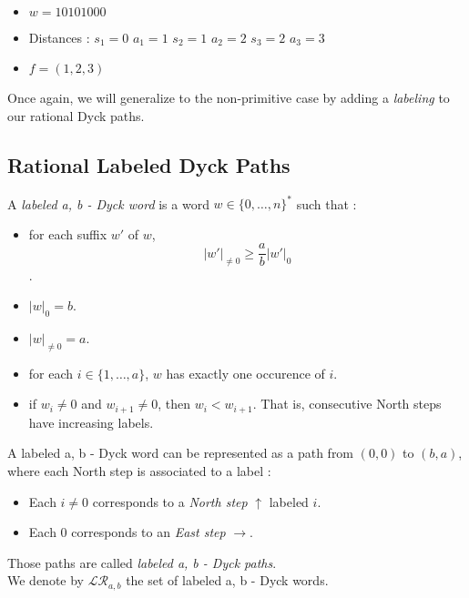 \begin{example}[$a < b : a = 3, b = 5,
    \mathcal{R}_{a,b} \to \mathcal{PF'}_{a,b}$]
    ~\
    \begin{itemize}
        \item $w = 10101000$
    \end{itemize}
    
    \begin{itemize}
        \item Distances : 
            \subitem $s_1 = 0$
                \hspace{2cm} $a_1 = 1$
            \subitem $s_2 = 1$
                \hspace{2cm} $a_2 = 2$
            \subitem $s_3 = 2$
                \hspace{2cm} $a_3 = 3$
        \item $f = (1, 2, 3)$
    \end{itemize}
    
\end{example}

Once again, we will generalize to the non-primitive case by
adding a \emph{labeling} to our rational Dyck paths.

\subsection{Rational Labeled Dyck Paths}

\begin{definition}
    A \emph{labeled a, b - Dyck word} is a word $w \in 
    \{0, \ldots, n\}^*$ such that :
    \begin{itemize}
        \item for each suffix $w'$ of $w$,
            $$|w'|_{\neq 0} \geqslant \frac{a}{b}|w'|_0$$.
        \item $|w|_0 = b$.
        \item $|w|_{\neq 0} = a$.
        \item for each $i \in \{1, \ldots, a\}$, $w$ has 
            exactly one occurence of $i$.
        \item if $w_i \neq 0$ and $w_{i+1} \neq 0$,
            then $w_i < w_{i+1}$. That is, consecutive
            North steps have increasing labels.
    \end{itemize}
\end{definition}

A labeled a, b - Dyck word can be represented
as a path from $(0,0)$ to $(b,a)$, where each North
step is associated to a label :
\begin{itemize}
    \item Each $i \neq 0$ corresponds to a
        \emph{North step} $\uparrow$ labeled $i$.
    \item Each $0$ corresponds to an
        \emph{East step} $\rightarrow$.
\end{itemize}
Those paths are called \emph{labeled a, b - Dyck paths}.\\
We denote by $\mathcal{LR}_{a,b}$ the set of labeled
a, b - Dyck words.


